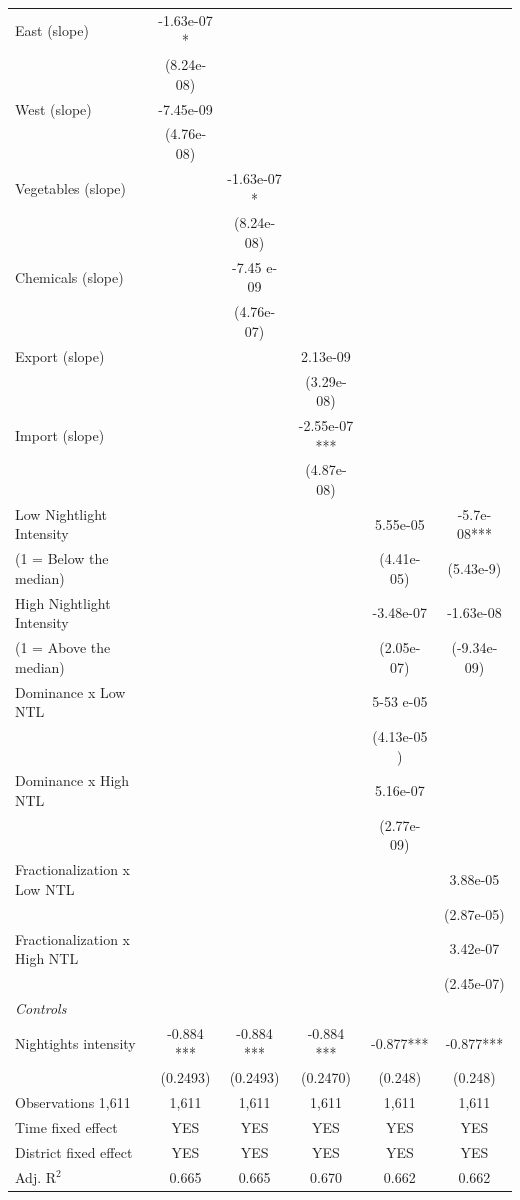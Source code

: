 \begin{table}[htbp]
{\begin{tabular}{lc|c|c|cc}
			East (slope) & -1.63e-07 *  & & &&\\
			& (8.24e-08)   &   &                  &&  \\
			West (slope) &  -7.45e-09 & &&&\\
			&    (4.76e-08)   & &          &     &  \\
			Vegetables (slope)  &  & -1.63e-07 * & && \\
			&  & (8.24e-08) & && \\
			Chemicals (slope) &  & -7.45 e-09 && &\\
			& &   (4.76e-07) & && \\
			Export (slope)   & & & 2.13e-09 &&\\
			 & & & (3.29e-08)& &\\
			Import (slope)  & & &  -2.55e-07 *** &&\\
			 & & &  (4.87e-08) && \\
			Low Nightlight Intensity         &&& & 5.55e-05           & -5.7e-08*** \\
			(1 = Below the median)  &&&&(4.41e-05)      & (5.43e-9) \\
			High Nightlight Intensity       &&&   & -3.48e-07    &-1.63e-08 \\
			(1 = Above the median) &&&& (2.05e-07)   & (-9.34e-09) \\
			Dominance x Low NTL   &&& & 5-53 e-05        & \\
			 &&&&(4.13e-05 )       & \\
			Dominance x High NTL    &                 &&& 5.16e-07 &\\
			 &                 &&&    (2.77e-09) &\\
			Fractionalization x Low NTL &&&&& 3.88e-05\\
			&&&&&(2.87e-05)\\
			Fractionalization x High NTL &&&&& 3.42e-07\\
			&&&&&(2.45e-07)\\
			\addlinespace[2pt]
			\textit{Controls} \\
			Nightights intensity & -0.884 *** & -0.884 *** & -0.884 *** & -0.877*** & -0.877*** \\
			 & (0.2493) & (0.2493) & (0.2470) &(0.248) & (0.248) \\
			\hline
			Observations 1,611 & 1,611 &1,611 & 1,611 & 1,611 & 1,611 \\
			Time fixed effect &YES& YES & YES & YES & YES\\
			District fixed effect&YES& YES & YES & YES & YES\\
			Adj. R$^2$    &0.665& 0.665 &0.670 & 0.662 & 0.662\\
			\hline
		\end{tabular}
	} %
	

\end{table}
